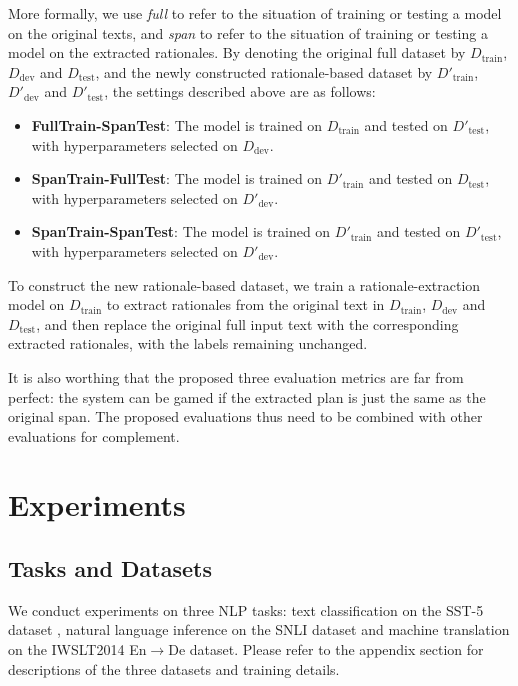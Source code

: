 \documentclass[11pt,a4paper]{article}
\begin{document}
   More formally, we use 
 {\it full} to refer to the situation of training or testing a model
on the original texts, 
 and  {\it span} to refer to the situation of training or testing a model
on the extracted rationales.  
By denoting the original full dataset by $D_\text{train}$, $D_\text{dev}$ and $D_\text{test}$, and the newly constructed rationale-based dataset by $D'_\text{train}$, $D'_\text{dev}$ and $D'_\text{test}$, the settings described above are as follows: 
\begin{itemize}
  \item {\bf FullTrain-SpanTest}: The model is trained on $D_\text{train}$ and tested on $D'_\text{test}$, with hyperparameters selected on $D_\text{dev}$.
  \item {\bf SpanTrain-FullTest}: The model is trained on $D'_\text{train}$ and tested on $D_\text{test}$, with hyperparameters selected on $D'_\text{dev}$.
  \item {\bf SpanTrain-SpanTest}: The model is trained on $D'_\text{train}$ and tested on $D'_\text{test}$, with hyperparameters selected on $D'_\text{dev}$.
\end{itemize}
To construct the new rationale-based dataset, we train a rationale-extraction model on $D_\text{train}$ to extract rationales from the original text in $D_\text{train}$, $D_\text{dev}$ and $D_\text{test}$, and then replace the original full input text with the corresponding extracted rationales, with the labels remaining unchanged.

It is also worthing that the proposed three evaluation metrics are far from perfect: the system can be gamed 
 if the extracted plan is just the same as the original span. The proposed evaluations thus need to be combined with other evaluations for complement.

\section{Experiments}
\subsection{Tasks and Datasets}
We conduct experiments on three NLP tasks: text classification on the SST-5 dataset \cite{socher2013recursive},
natural language inference on the SNLI dataset \cite{bowman2015large} 
and  machine translation on the IWSLT2014 En$\rightarrow$De dataset. 
Please refer to the appendix section for descriptions of the three datasets and training details. 
\end{document}
